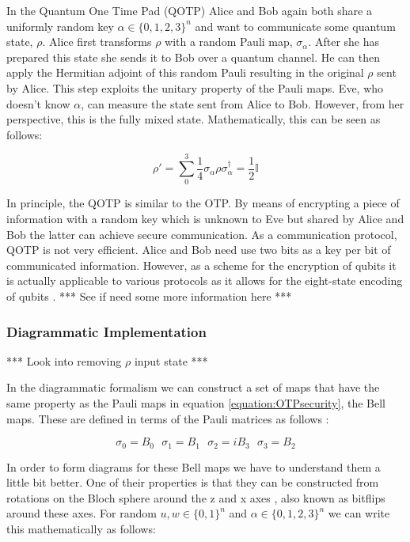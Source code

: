 \documentclass[]{article}
\begin{document}
In the Quantum One Time Pad (QOTP) Alice and Bob again both share a uniformly random key $ \alpha \in \{0,1,2,3\}^n$ and want to communicate some quantum state, $\rho$. Alice first transforms $\rho$ with a random Pauli map, $\sigma_\alpha$. After she has prepared this state she sends it to Bob over a quantum channel. He can then apply the Hermitian adjoint of this random Pauli resulting in the original $\rho$ sent by Alice. This step exploits the unitary property of the Pauli maps. Eve, who doesn't know $\alpha$, can measure the state sent from Alice to Bob. However, from her perspective, this is the fully mixed state. Mathematically, this can be seen as follows:

\begin{equation}
	\label{equation:OTPsecurity}
	\rho' = \sum\limits_0^3 \frac{1}{4} \sigma_\alpha \rho \sigma_\alpha^\dagger = \frac{1}{2}\mathbb{I}
\end{equation}

In principle, the QOTP is similar to the OTP. By means of encrypting a piece of information with a random key which is unknown to Eve but shared by Alice and Bob the latter can achieve secure communication. As a communication protocol, QOTP is not very efficient. Alice and Bob need use two bits as a key per bit of communicated information. However, as a scheme for the encryption of qubits it is actually applicable to various protocols as it allows for the eight-state encoding of qubits \cite{DeVries2016}. *** See if need some more information here ***

\subsubsection{Diagrammatic Implementation}

*** Look into removing $\rho$ input state ***

In the diagrammatic formalism we can construct a set of maps that have the same property as the Pauli maps in equation \ref{equation:OTPsecurity}, the Bell maps. These are defined in terms of the Pauli matrices as follows \cite{Coecke2017}:

\begin{equation}
	\sigma_0 = B_0 ~~~ \sigma_1 = B_1 ~~~ \sigma_2 = iB_3 ~~~ \sigma_3 = B_2 
\end{equation}

In order to form diagrams for these Bell maps we have to understand them a little bit better. One of their properties is that they can be constructed from rotations on the Bloch sphere around the z and x axes \cite{DJORDJEVIC2012227}, also known as bitflips around these axes. For random $u, w \in \{0,1\}^n$ and $\alpha \in \{0,1,2,3\}^n$ we can write this mathematically as follows:
\end{document}
